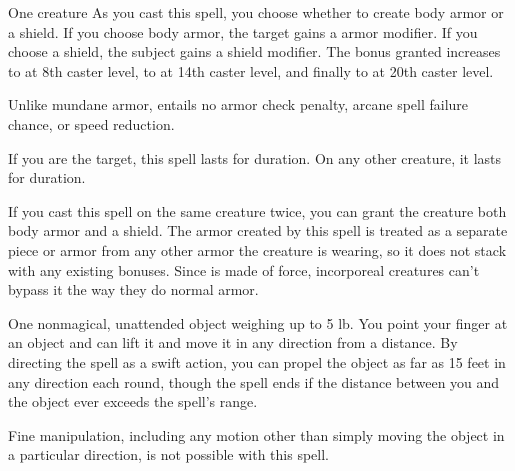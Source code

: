 \spellrng{\rngclose}
\begin{spelltarget}{One creature}
    \spelleffect As you cast this spell, you choose whether to create body armor or a shield. If you choose body armor, the target gains a  armor modifier. If you choose a shield, the subject gains a  shield modifier. The bonus granted increases to  at 8th caster level, to  at 14th caster level, and finally to  at 20th caster level. 
    \par Unlike mundane armor,  entails no armor check penalty, arcane spell failure chance, or speed reduction.
    \par If you are the target, this spell lasts for \durlong duration. On any other creature, it lasts for \durshort duration.
\end{spelltarget}
\spellnotes If you cast this spell on the same creature twice, you can grant the creature both body armor and a shield. The armor created by this spell is treated as a separate piece or armor from any other armor the creature is wearing, so it does not stack with any existing bonuses. Since  is made of force, incorporeal creatures can't bypass it the way they do normal armor.

\spellrng{\rngclose}
\spelldur{\durshort}
\begin{spelltarget}{One nonmagical, unattended object weighing up to 5 lb.}
    \spelleffect You point your finger at an object and can lift it and move it in any direction from a distance. By directing the spell as a swift action, you can propel the object as far as 15 feet in any direction each round, though the spell ends if the distance between you and the object ever exceeds the spell's range.
\end{spelltarget}
\spellnotes Fine manipulation, including any motion other than simply moving the object in a particular direction, is not possible with this spell.

